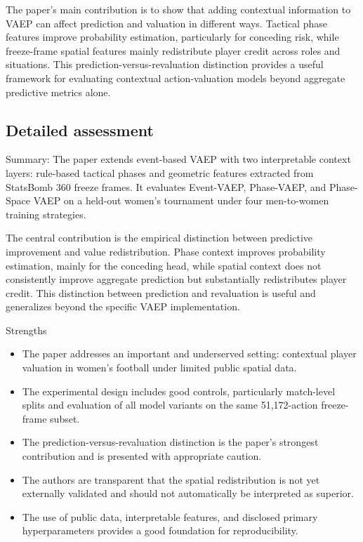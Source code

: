 \documentclass[11pt,a4paper]{article}
\begin{document}
\begin{reviewbox}
The paper’s main contribution is to show that adding contextual information to VAEP can affect prediction and valuation in different ways. Tactical phase features improve probability estimation, particularly for conceding risk, while freeze-frame spatial features mainly redistribute player credit across roles and situations. This prediction-versus-revaluation distinction provides a useful framework for evaluating contextual action-valuation models beyond aggregate predictive metrics alone.
\end{reviewbox}

\subsection{Detailed assessment}

\begin{reviewbox}
Summary: The paper extends event-based VAEP with two interpretable context layers: rule-based tactical phases and geometric features extracted from StatsBomb 360 freeze frames. It evaluates Event-VAEP, Phase-VAEP, and Phase-Space VAEP on a held-out women’s tournament under four men-to-women training strategies.

The central contribution is the empirical distinction between predictive improvement and value redistribution. Phase context improves probability estimation, mainly for the conceding head, while spatial context does not consistently improve aggregate prediction but substantially redistributes player credit. This distinction between prediction and revaluation is useful and generalizes beyond the specific VAEP implementation.

Strengths
\begin{itemize}
  \item The paper addresses an important and underserved setting: contextual player valuation in women’s football under limited public spatial data.
  \item The experimental design includes good controls, particularly match-level splits and evaluation of all model variants on the same 51,172-action freeze-frame subset.
  \item The prediction-versus-revaluation distinction is the paper’s strongest contribution and is presented with appropriate caution.
  \item The authors are transparent that the spatial redistribution is not yet externally validated and should not automatically be interpreted as superior.
  \item The use of public data, interpretable features, and disclosed primary hyperparameters provides a good foundation for reproducibility.
\end{itemize}
\end{reviewbox}
\end{document}
